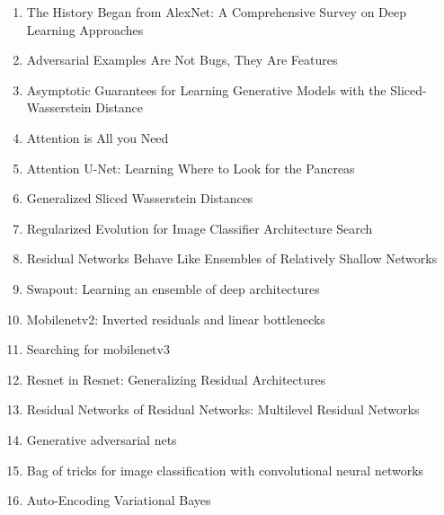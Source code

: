 \documentclass[acmlarge]{acmart}
\begin{document}
\begin{enumerate}
	\item The History Began from AlexNet: A Comprehensive Survey on Deep Learning Approaches \cite{Alom2018TheHB} 

	\item Adversarial Examples Are Not Bugs, They Are Features \cite{Ilyas2019AdversarialEA} 

	\item Asymptotic Guarantees for Learning Generative Models with the Sliced-Wasserstein Distance \cite{Nadjahi2019AsymptoticGF} 

	\item Attention is All you Need \cite{Vaswani2017AttentionIA} 

	\item Attention U-Net: Learning Where to Look for the Pancreas \cite{Oktay2018AttentionUL} 

	\item Generalized Sliced Wasserstein Distances \cite{Kolouri2019GeneralizedSW} 

	\item Regularized Evolution for Image Classifier Architecture Search \cite{Real2019RegularizedEF} 

	\item Residual Networks Behave Like Ensembles of Relatively Shallow Networks \cite{Veit2016ResidualNB} 

	\item Swapout: Learning an ensemble of deep architectures \cite{Singh2016SwapoutLA} 

	\item Mobilenetv2: Inverted residuals and linear bottlenecks \cite{sandler2018mobilenetv2} 

	\item Searching for mobilenetv3 \cite{howard2019searching} 

	\item Resnet in Resnet: Generalizing Residual Architectures \cite{Targ2016ResnetIR} 

	\item Residual Networks of Residual Networks: Multilevel Residual Networks \cite{Zhang2018ResidualNO} 

	\item Generative adversarial nets \cite{goodfellow2014generative} 

	\item Bag of tricks for image classification with convolutional neural networks \cite{he2019bag} 

	\item Auto-Encoding Variational Bayes \cite{Kingma2014AutoEncodingVB} 


\end{enumerate}
\end{document}
